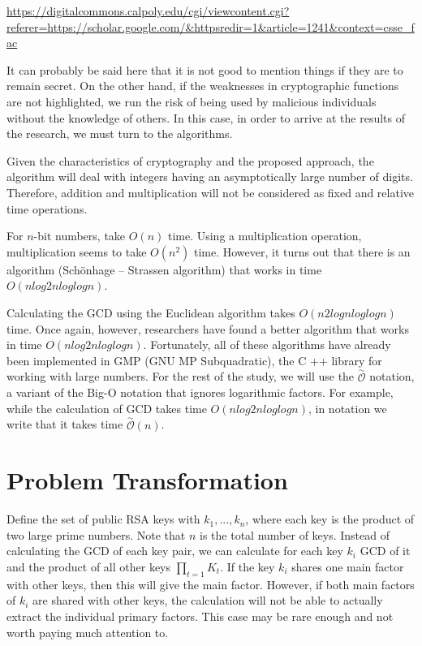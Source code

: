 \documentclass[graybox]{svmult}
\begin{document}
\url{https://digitalcommons.calpoly.edu/cgi/viewcontent.cgi?referer=https://scholar.google.com/&httpsredir=1&article=1241&context=csse_fac}

It can probably be said here that it is not good to mention things if they are to remain secret. On the other hand, if the weaknesses in cryptographic functions are not highlighted, we run the risk of being used by malicious individuals without the knowledge of others. In this case, in order to arrive at the results of the research, we must turn to the algorithms. 

Given the characteristics of cryptography and the proposed approach, the algorithm will deal with integers having an asymptotically large number of digits. Therefore, addition and multiplication will not be considered as fixed and relative time operations.

For $n$-bit numbers, take $O(n)$ time. Using a multiplication operation, multiplication seems to take $O(n^2)$ time. However, it turns out that there is an algorithm (Schönhage – Strassen algorithm) that works in time $O(n log 2 n log log n)$.

Calculating the GCD using the Euclidean algorithm takes $O(n2 log n log log n)$ time. Once again, however, researchers have found a better algorithm that works in time $O (n log 2 n log log n)$. Fortunately, all of these algorithms have already been implemented in GMP (GNU MP Subquadratic), the C ++ library for working with large numbers. For the rest of the study, we will use the $\overset{\sim}{\mathcal{O}}$ notation, a variant of the Big-O notation that ignores logarithmic factors. For example, while the calculation of GCD takes time $O (n log 2 n log log n)$, in notation we write that it takes time $\overset{\sim}{\mathcal{O}}(n)$.

\section{Problem Transformation}
\label{sec:4}

Define the set of public RSA keys with $k_1, ... , k_n$, where each key is the product of two large prime numbers. Note that $n$ is the total number of keys. Instead of calculating the GCD of each key pair, we can calculate for each key $k_i$ GCD of it and the product of all other keys $\prod_{t=1} K_t$. If the key $k_i$ shares one main factor with other keys, then this will give the main factor. However, if both main factors of $k_i$ are shared with other keys, the calculation will not be able to actually extract the individual primary factors. This case may be rare enough and not worth paying much attention to. 
\end{document}
